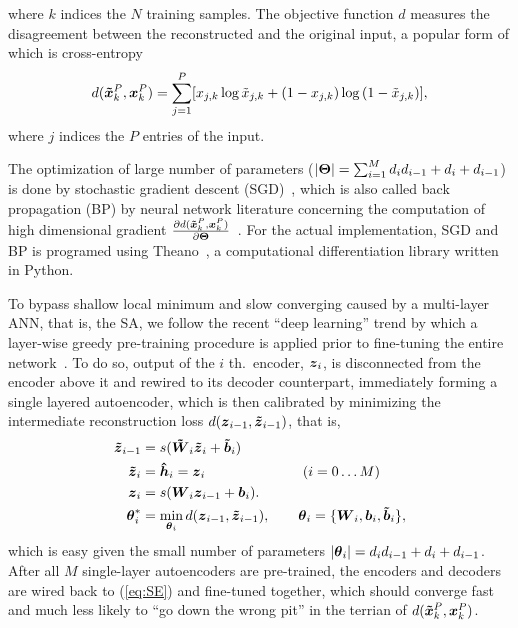 where $k$ indices the $N$ training samples. The objective function $d$ measures the disagreement between the reconstructed and the original input, a popular form of which is cross-entropy
\begin{align} \label{eq:CE}
  d(\boldsymbol{\tilde{x}}_k^P, \boldsymbol{x}_k^P) = \sum_{j=1}^P[{x_{j,k}\log{\tilde{x}_{j,k}} + (1 - x_{j,k})\log{(1 - \tilde{x}_{j,k})}}],
\end{align}
where $j$ indices the $P$ entries of the input. 

The optimization of large number of parameters ($|\boldsymbol{\Theta}| = \sum_{i=1}^M{d_i d_{i-1} + d_i + d_{i-1}}$) is done by stochastic gradient descent (SGD)~\cite{SGD1, SGD2}, which is also called back propagation (BP) by neural network literature concerning the computation of high dimensional gradient $\frac{\partial d(\boldsymbol{\tilde{x}}_k^P, \boldsymbol{x}_k^P)}{\partial \boldsymbol{\Theta}}$~\cite{BP1, BP2, BP3}. For the actual implementation, SGD and BP is programed using Theano~\cite{Theano1}, a computational differentiation library written in Python. 

To bypass shallow local minimum and slow converging caused by a multi-layer ANN, that is, the SA, we follow the recent ``deep learning'' trend by which a layer-wise greedy pre-training procedure is applied prior to fine-tuning the entire network~\cite{DL:DBN1, DL:SDA1}. To do so, output of the $i$ th.\ encoder, $\boldsymbol{z}_i$, is disconnected from the encoder above it and rewired to its decoder counterpart, immediately forming a single layered autoencoder, which is then calibrated by minimizing the intermediate reconstruction loss $d(\boldsymbol{z}_{i-1}, \boldsymbol{\tilde{z}}_{i-1})$, that is,
\begin{equation}\label{eq:Greedy}
  \begin{split}
    \boldsymbol{\tilde{z}}_{i-1} &= s(\boldsymbol{\tilde{W}}_i \boldsymbol{\tilde{z}}_i + \boldsymbol{\tilde{b}}_i) \\
    \boldsymbol{\tilde{z}}_{i  } &= \boldsymbol{\hat{h}}_i = \boldsymbol{z}_i \quad \qquad \qquad \qquad (i = 0 \dots M) \\
    \boldsymbol{z}_{i  } &= s(\boldsymbol{W}_i\boldsymbol{z}_{i-1} + \boldsymbol{b}_i). \\
    \boldsymbol{\theta}_i^* &= \min_{\boldsymbol{\theta}_i}{d(\boldsymbol{z}_{i-1}, \boldsymbol{\tilde{z}}_{i-1})}, \qquad \boldsymbol{\theta}_i = \{\boldsymbol{W}_i, \boldsymbol{b}_i, \boldsymbol{\tilde{b}}_i\},
  \end{split}
\end{equation}
which is easy given the small number of parameters $|\boldsymbol{\theta}_i|=d_i d_{i-1} + d_i + d_{i-1}$. After all $M$ single-layer autoencoders are pre-trained, the encoders and decoders are wired back to (\ref{eq:SE}) and fine-tuned together, which should converge fast and much less likely to ``go down the wrong pit'' in the terrian of $d(\boldsymbol{\tilde{x}}_k^P, \boldsymbol{x}_k^P)$.

